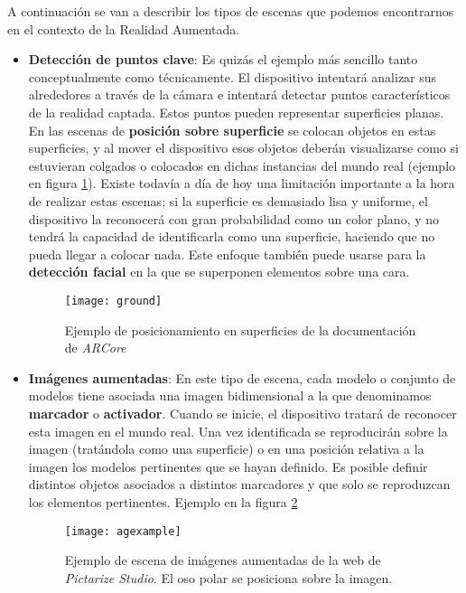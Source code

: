 A continuación se van a describir los tipos de escenas que podemos encontrarnos en el contexto de la Realidad Aumentada.

\begin{itemize}
    \item \textbf{Detección de puntos clave}: Es quizás el ejemplo más sencillo tanto conceptualmente como técnicamente. El dispositivo intentará analizar sus alrededores a través de la cámara e intentará detectar puntos característicos de la realidad captada. Estos puntos pueden representar superficies planas. En las escenas de \textbf{posición sobre superficie} se colocan objetos en estas superficies, y al mover el dispositivo esos objetos deberán visualizarse como si estuvieran colgados o colocados en dichas instancias del mundo real (ejemplo en figura \ref{fig:ground}). Existe todavía a día de hoy una limitación importante a la hora de realizar estas escenas; si la superficie es demasiado lisa y uniforme, el dispositivo la reconocerá con gran probabilidad como un color plano, y no tendrá la capacidad de identificarla como una superficie, haciendo que no pueda llegar a colocar nada. Este enfoque también puede usarse para la \textbf{detección facial} en la que se superponen elementos sobre una cara.
    
    \begin{figure}[h]
        \centering
        \texttt{[image: ground]}
        \caption[Ejemplo de escena de posicionamiento por superficie]{Ejemplo de posicionamiento en superficies de la documentación de \textit{ARCore}\cite{arcore}}
        \label{fig:ground}
    \end{figure}

    \item \textbf{Imágenes aumentadas}: En este tipo de escena, cada modelo o conjunto de modelos tiene asociada una imagen bidimensional a la que denominamos \textbf{marcador} o \textbf{activador}. Cuando se inicie, el dispositivo tratará de reconocer esta imagen en el mundo real. Una vez identificada se reproducirán sobre la imagen (tratándola como una superficie) o en una posición relativa a la imagen los modelos pertinentes que se hayan definido. Es posible definir distintos objetos asociados a distintos marcadores y que solo se reproduzcan los elementos pertinentes. Ejemplo en la figura \ref{fig:agexample}
    
    \begin{figure}[H]
        \centering
        \texttt{[image: agexample]}
        \caption[Ejemplo de escena de imágenes aumentadas]{Ejemplo de escena de imágenes aumentadas de la web de \textit{Pictarize Studio}\cite{pictarize}. El oso polar se posiciona sobre la imagen.}
        \label{fig:agexample}
    \end{figure}


\end{itemize}
